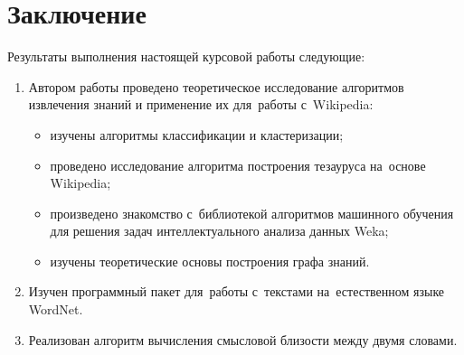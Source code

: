 \section*{Заключение}

Результаты выполнения настоящей курсовой работы следующие:

\begin{enumerate}

\item{
Автором работы проведено теоретическое исследование алгоритмов извлечения знаний и применение их для~работы с~Wikipedia:
}

 \begin{itemize}

\item{изучены алгоритмы классификации и кластеризации;}
\item{проведено исследование алгоритма построения тезауруса на~основе Wikipedia;}
\item{произведено знакомство с~библиотекой алгоритмов машинного обучения для решения задач интеллектуального анализа данных Weka;}
\item{изучены теоретические основы построения графа знаний.}

 \end{itemize}

\item{Изучен программный пакет для~работы с~текстами на~естественном языке WordNet.}
\item{Реализован алгоритм вычисления смысловой близости между двумя словами.}

\end{enumerate}
